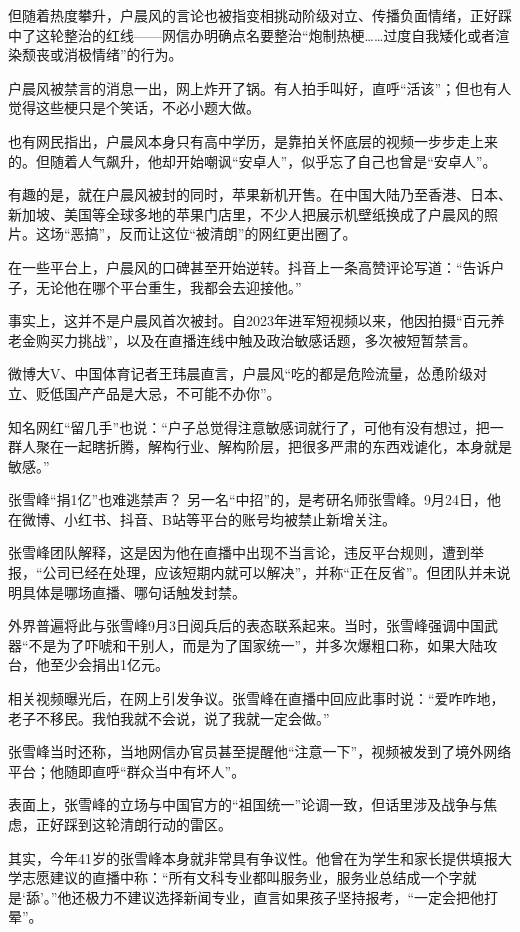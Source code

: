 {但随着热度攀升，户晨风的言论也被指变相挑动阶级对立、传播负面情绪，正好踩中了这轮整治的红线——网信办明确点名要整治“炮制热梗……过度自我矮化或者渲染颓丧或消极情绪”的行为。

户晨风被禁言的消息一出，网上炸开了锅。有人拍手叫好，直呼“活该”；但也有人觉得这些梗只是个笑话，不必小题大做。

也有网民指出，户晨风本身只有高中学历，是靠拍关怀底层的视频一步步走上来的。但随着人气飙升，他却开始嘲讽“安卓人”，似乎忘了自己也曾是“安卓人”。

有趣的是，就在户晨风被封的同时，苹果新机开售。在中国大陆乃至香港、日本、新加坡、美国等全球多地的苹果门店里，不少人把展示机壁纸换成了户晨风的照片。这场“恶搞”，反而让这位“被清朗”的网红更出圈了。

在一些平台上，户晨风的口碑甚至开始逆转。抖音上一条高赞评论写道：“告诉户子，无论他在哪个平台重生，我都会去迎接他。”

事实上，这并不是户晨风首次被封。自2023年进军短视频以来，他因拍摄“百元养老金购买力挑战”，以及在直播连线中触及政治敏感话题，多次被短暂禁言。

微博大V、中国体育记者王玮晨直言，户晨风“吃的都是危险流量，怂恿阶级对立、贬低国产产品是大忌，不可能不办你”。

知名网红“留几手”也说：“户子总觉得注意敏感词就行了，可他有没有想过，把一群人聚在一起瞎折腾，解构行业、解构阶层，把很多严肃的东西戏谑化，本身就是敏感。”

张雪峰“捐1亿”也难逃禁声？
另一名“中招”的，是考研名师张雪峰。9月24日，他在微博、小红书、抖音、B站等平台的账号均被禁止新增关注。

张雪峰团队解释，这是因为他在直播中出现不当言论，违反平台规则，遭到举报，“公司已经在处理，应该短期内就可以解决”，并称“正在反省”。但团队并未说明具体是哪场直播、哪句话触发封禁。

外界普遍将此与张雪峰9月3日阅兵后的表态联系起来。当时，张雪峰强调中国武器“不是为了吓唬和干别人，而是为了国家统一”，并多次爆粗口称，如果大陆攻台，他至少会捐出1亿元。

相关视频曝光后，在网上引发争议。张雪峰在直播中回应此事时说：“爱咋咋地，老子不移民。我怕我就不会说，说了我就一定会做。”

张雪峰当时还称，当地网信办官员甚至提醒他“注意一下”，视频被发到了境外网络平台；他随即直呼“群众当中有坏人”。

表面上，张雪峰的立场与中国官方的“祖国统一”论调一致，但话里涉及战争与焦虑，正好踩到这轮清朗行动的雷区。

其实，今年41岁的张雪峰本身就非常具有争议性。他曾在为学生和家长提供填报大学志愿建议的直播中称：“所有文科专业都叫服务业，服务业总结成一个字就是‘舔’。”他还极力不建议选择新闻专业，直言如果孩子坚持报考，“一定会把他打晕”。

}
